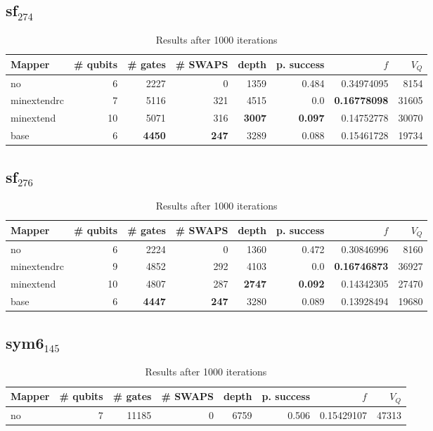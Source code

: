 \documentclass[11pt]{article}
\begin{document}
\subsection{sf\(_{\text{274}}\)}
\label{sec:org9e5cb20}
\begin{table}[H]
\caption{\label{tab:orge92b000}
Results after 1000 iterations}
\centering
\small
\begin{tabular}{lrrrrrrr}
\hline
Mapper & \# qubits & \# gates & \# SWAPS & depth & p. success & \(f\) & \(V_Q\)\\
\hline
no & 6 & 2227 & 0 & 1359 & 0.484 & 0.34974095 & 8154\\
\hline
minextendrc & 7 & 5116 & 321 & 4515 & 0.0 & \textbf{0.16778098} & 31605\\
minextend & 10 & 5071 & 316 & \textbf{3007} & \textbf{0.097} & 0.14752778 & 30070\\
base & 6 & \textbf{4450} & \textbf{247} & 3289 & 0.088 & 0.15461728 & 19734\\
\hline
\end{tabular}
\end{table}
\subsection{sf\(_{\text{276}}\)}
\label{sec:orgcc80b6b}
\begin{table}[H]
\caption{\label{tab:orga80b21c}
Results after 1000 iterations}
\centering
\small
\begin{tabular}{lrrrrrrr}
\hline
Mapper & \# qubits & \# gates & \# SWAPS & depth & p. success & \(f\) & \(V_Q\)\\
\hline
no & 6 & 2224 & 0 & 1360 & 0.472 & 0.30846996 & 8160\\
\hline
minextendrc & 9 & 4852 & 292 & 4103 & 0.0 & \textbf{0.16746873} & 36927\\
minextend & 10 & 4807 & 287 & \textbf{2747} & \textbf{0.092} & 0.14342305 & 27470\\
base & 6 & \textbf{4447} & \textbf{247} & 3280 & 0.089 & 0.13928494 & 19680\\
\hline
\end{tabular}
\end{table}
\subsection{sym6\(_{\text{145}}\)}
\label{sec:org4c7ac65}
\begin{table}[H]
\caption{\label{tab:orgc55c484}
Results after 1000 iterations}
\centering
\small
\begin{tabular}{lrrrrrrr}
\hline
Mapper & \# qubits & \# gates & \# SWAPS & depth & p. success & \(f\) & \(V_Q\)\\
\hline
no & 7 & 11185 & 0 & 6759 & 0.506 & 0.15429107 & 47313\\
\hline
\end{tabular}
\end{table}
\end{document}
